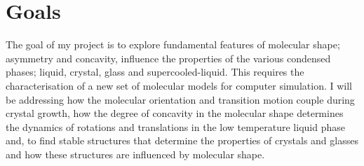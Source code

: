 \section{Goals}

The goal of my project is to explore fundamental features of molecular shape; asymmetry and concavity, influence the properties of the various condensed phases; liquid, crystal, glass and supercooled-liquid. This requires the characterisation of a new set of molecular models for computer simulation. I will be addressing how the molecular orientation and transition motion couple during crystal growth, how the degree of concavity in the molecular shape determines the dynamics of rotations and translations in the low temperature liquid phase and, to find stable structures that determine the properties of crystals and glasses and how these structures are influenced by molecular shape.

